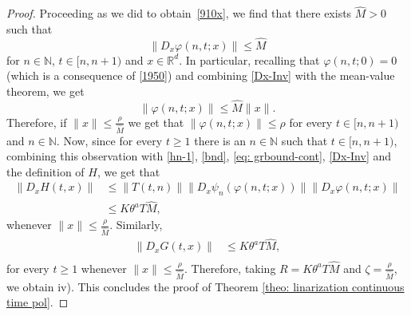 \documentclass[reqno, a4paper, 10pt]{amsart}
\theoremstyle{plain}
\numberwithin{equation}{section}
\theoremstyle{remark}
\renewcommand{\phi}{\varphi}
\def\N{\mathbb{N}}
\def\R{\mathbb{R}}
\begin{document}
\begin{proof}
Proceeding as we did to obtain~\eqref{910x}, we find that there exists $\hat M>0$ such that
\begin{equation}\label{Dx-Inv}
\|D_x\phi(n,t;x) \| \le  \hat M
\end{equation}
for $n\in \N$, $t\in [n, n+1)$ and $x\in \R^d$. In particular, recalling that $\varphi(n,t;0)=0$ (which is a consequence of \eqref{1950}) and combining \eqref{Dx-Inv} with the mean-value theorem, we get
\begin{equation}\label{bx1}
\|\phi(n,t;x) \| \le \hat M  \|x\|.
\end{equation}
Therefore, if $\|x\|\leq \frac{ \rho}{\hat M}$ we get that $\|\phi(n,t;x) \| \leq \rho$ for every $t\in[n,n+1)$ and $n\in \N$. Now, since for every
$t\ge 1$ there is an $n\in\mathbb{N}$ such that $t\in [n,n+1)$, combining this observation with \eqref{hn-1}, \eqref{bnd}, \eqref{eq: grbound-cont}, \eqref{Dx-Inv} and the definition of $H$, we get that 
\[
\begin{split}
\|D_xH(t,x)\|&\leq\|T(t,n)\| \|D_x\psi_n (\phi(n, t;x))\|\|D_x\phi(n, t;x)\|\\
&\leq K \theta^a T  \hat M,
\end{split}
\]
whenever $\|x\|\leq \frac{\rho}{\hat M }$. Similarly,
\[
\begin{split}
\|D_xG(t,x)\|&\leq K \theta^a T  \hat M,\\
\end{split}
\]
for every $t\geq 1$ whenever $\|x\|\leq \frac{ \rho}{\hat M }$. Therefore, taking $R=K \theta^a T  \hat M$ and $\zeta =\frac{\rho}{\hat M}$, we obtain iv). This concludes the proof of Theorem \ref{theo: linarization continuous time pol}.
\end{proof}
\end{document}
